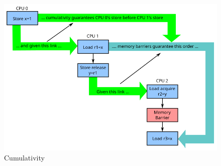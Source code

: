 \begin{figure}[tbp]
\centering
\includegraphics{memorder/memorybarriercum}
\caption{Cumulativity}
\label{fig:memorder:Cumulativity}
\end{figure}

